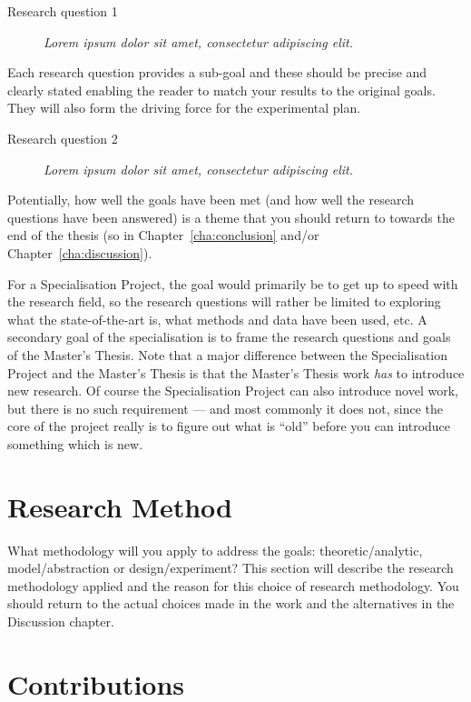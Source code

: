 \begin{description}
\item[Research question 1] \textit{Lorem ipsum dolor sit amet, consectetur adipiscing elit.}
\end{description}

Each research question provides a sub-goal and these should be precise and clearly stated enabling the reader to match your results to the original goals. 
They will also form the driving force for the experimental plan. 

\begin{description}
\item[Research question 2] \textit{Lorem ipsum dolor sit amet, consectetur adipiscing elit.}
\end{description}

Potentially, how well the goals have been met (and how well the research questions have been answered)
is a theme that you should return to towards the end of the thesis (so in Chapter~\ref{cha:conclusion} and/or Chapter~\ref{cha:discussion}).

For a Specialisation Project, the goal would primarily be to get up to speed with the research field, so the research questions will rather be
limited to exploring what the state-of-the-art is, what methods and data have been used, etc. 
A secondary goal of the specialisation is to frame the research questions and goals of the Master's Thesis.
Note that a major difference between the Specialisation Project and the Master's Thesis is that the Master's Thesis work \textit{has\/} to
introduce new research. 
Of course the Specialisation Project can also introduce novel work, but there is no such requirement --- and most commonly it does not,
since the core of the project really is to figure out what is ``old'' before you can introduce something which is new.

\section{Research Method}
\label{sec:researchMethod}

What methodology will you apply to address the goals: theoretic/analytic, model/abstraction or design/experiment? 
This section will describe the research methodology applied and the reason for this choice of research methodology. 
You should return to the actual choices made in the work and the alternatives in the Discussion chapter.

\section{Contributions}
\label{sec:introContributions}


